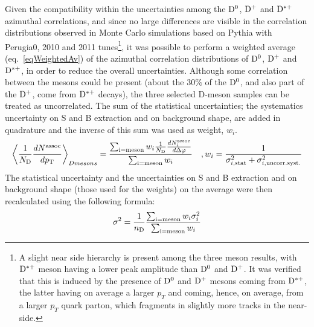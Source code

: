 %
%
%
%
Given the compatibility within the uncertainties among the ${\rm D^0}$, ${\rm D^+}$ and ${\rm D^{*+}}$ azimuthal correlations, and since no large differences are visible in the correlation distributions observed in Monte Carlo simulations based on Pythia with Perugia0, 2010 and 2011 tunes\footnote{A slight near side hierarchy is present among the three meson results, with ${\rm D^{*+}}$ meson having a lower peak amplitude than ${\rm D^0}$ and ${\rm D^+}$. It was verified that this is induced by the presence of ${\rm D^0}$ and ${\rm D^+}$ mesons coming from ${\rm D^{*+}}$, the latter having on average a larger $p_T$ and coming, hence, on average, from a larger $p_T$ quark parton, which fragments in slightly more tracks in the near-side.}, it was possible to perform a weighted average (eq.~\ref{eqWeightedAv}) of the azimuthal correlation distributions of ${\rm D^0}$, ${\rm D^+}$ and ${\rm D^{*+}}$, in order to reduce the overall uncertainties.
Although some correlation between the mesons could be present (about the 30$\%$ of the ${\rm D^0}$, and also part of the ${\rm D^+}$, come from ${\rm D^{*+}}$ decays), the three selected D-meson samples can be treated as uncorrelated. The sum of the statistical uncertainties; the systematics uncertainty on S and B extraction and on background shape, are added in quadrature and the inverse of this sum was used as weight, $w_i$.
\begin{equation}
  \left \langle \frac{1}{N_{\rm D}}\frac{dN^{\rm assoc}}{dp_{\rm T}} \right \rangle_{D mesons} =  \frac{\sum_{\rm i=meson}w_{i}\frac{1}{N_{\rm D}}\frac{dN^{\rm assoc}_{i}}{d\Delta\varphi}}{\sum_{\rm i=meson}w_{i}}\quad , w_{i}=\frac{1}{\sigma^{2}_{i, \rm stat}+\sigma^{2}_{i, \rm uncorr. syst.}}
\label{eqWeightedAv}
\end{equation}
The statistical uncertainty and the uncertainties on S and B extraction and on background shape (those used for the weights) on the average were then recalculated using the following formula:
\begin{equation}
  \sigma^{2}=\frac{1}{n_{\rm D}}\frac{\sum_{\rm i=meson}w_{i}\sigma^{2}_{i}}{\sum_{\rm i=meson}w_{i}}
\end{equation}
